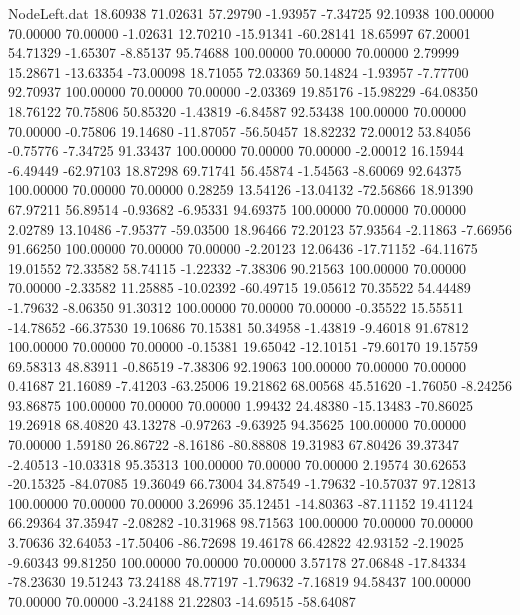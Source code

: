 \begin{filecontents}{NodeLeft.dat}
  18.60938   71.02631   57.29790    -1.93957   -7.34725   92.10938  100.00000   70.00000   70.00000   -1.02631   12.70210  -15.91341  -60.28141
  18.65997   67.20001   54.71329    -1.65307   -8.85137   95.74688  100.00000   70.00000   70.00000    2.79999   15.28671  -13.63354  -73.00098
  18.71055   72.03369   50.14824    -1.93957   -7.77700   92.70937  100.00000   70.00000   70.00000   -2.03369   19.85176  -15.98229  -64.08350
  18.76122   70.75806   50.85320    -1.43819   -6.84587   92.53438  100.00000   70.00000   70.00000   -0.75806   19.14680  -11.87057  -56.50457
  18.82232   72.00012   53.84056    -0.75776   -7.34725   91.33437  100.00000   70.00000   70.00000   -2.00012   16.15944   -6.49449  -62.97103
  18.87298   69.71741   56.45874    -1.54563   -8.60069   92.64375  100.00000   70.00000   70.00000    0.28259   13.54126  -13.04132  -72.56866
  18.91390   67.97211   56.89514    -0.93682   -6.95331   94.69375  100.00000   70.00000   70.00000    2.02789   13.10486   -7.95377  -59.03500
  18.96466   72.20123   57.93564    -2.11863   -7.66956   91.66250  100.00000   70.00000   70.00000   -2.20123   12.06436  -17.71152  -64.11675
  19.01552   72.33582   58.74115    -1.22332   -7.38306   90.21563  100.00000   70.00000   70.00000   -2.33582   11.25885  -10.02392  -60.49715
  19.05612   70.35522   54.44489    -1.79632   -8.06350   91.30312  100.00000   70.00000   70.00000   -0.35522   15.55511  -14.78652  -66.37530
  19.10686   70.15381   50.34958    -1.43819   -9.46018   91.67812  100.00000   70.00000   70.00000   -0.15381   19.65042  -12.10151  -79.60170
  19.15759   69.58313   48.83911    -0.86519   -7.38306   92.19063  100.00000   70.00000   70.00000    0.41687   21.16089   -7.41203  -63.25006
  19.21862   68.00568   45.51620    -1.76050   -8.24256   93.86875  100.00000   70.00000   70.00000    1.99432   24.48380  -15.13483  -70.86025
  19.26918   68.40820   43.13278    -0.97263   -9.63925   94.35625  100.00000   70.00000   70.00000    1.59180   26.86722   -8.16186  -80.88808
  19.31983   67.80426   39.37347    -2.40513  -10.03318   95.35313  100.00000   70.00000   70.00000    2.19574   30.62653  -20.15325  -84.07085
  19.36049   66.73004   34.87549    -1.79632  -10.57037   97.12813  100.00000   70.00000   70.00000    3.26996   35.12451  -14.80363  -87.11152
  19.41124   66.29364   37.35947    -2.08282  -10.31968   98.71563  100.00000   70.00000   70.00000    3.70636   32.64053  -17.50406  -86.72698
  19.46178   66.42822   42.93152    -2.19025   -9.60343   99.81250  100.00000   70.00000   70.00000    3.57178   27.06848  -17.84334  -78.23630
  19.51243   73.24188   48.77197    -1.79632   -7.16819   94.58437  100.00000   70.00000   70.00000   -3.24188   21.22803  -14.69515  -58.64087

\end{filecontents}
